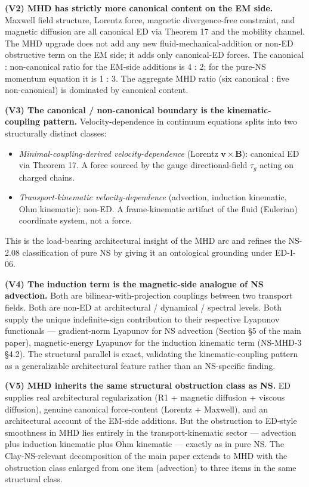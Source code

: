 \documentclass[
]{article}
\providecommand{\tightlist}{%
  \setlength{\itemsep}{0pt}\setlength{\parskip}{0pt}}
\begin{document}
\textbf{(V2) MHD has strictly more canonical content on the EM side.}
Maxwell field structure, Lorentz force, magnetic divergence-free
constraint, and magnetic diffusion are all canonical ED via Theorem 17
and the mobility channel. The MHD upgrade does not add any new
fluid-mechanical-addition or non-ED obstructive term on the EM side; it
adds only canonical-ED forces. The canonical : non-canonical ratio for
the EM-side additions is 4 : 2; for the pure-NS momentum equation it is
1 : 3. The aggregate MHD ratio (six canonical : five non-canonical) is
dominated by canonical content.

\textbf{(V3) The canonical / non-canonical boundary is the
kinematic-coupling pattern.} Velocity-dependence in continuum equations
splits into two structurally distinct classes:

\begin{itemize}
\tightlist
\item
  \emph{Minimal-coupling-derived velocity-dependence} (Lorentz
  \(\mathbf{v}\times\mathbf{B}\)): canonical ED via Theorem 17. A force
  sourced by the gauge directional-field \(\tau_g\) acting on charged
  chains.
\item
  \emph{Transport-kinematic velocity-dependence} (advection, induction
  kinematic, Ohm kinematic): non-ED. A frame-kinematic artifact of the
  fluid (Eulerian) coordinate system, not a force.
\end{itemize}

This is the load-bearing architectural insight of the MHD arc and
refines the NS-2.08 classification of pure NS by giving it an
ontological grounding under ED-I-06.

\textbf{(V4) The induction term is the magnetic-side analogue of NS
advection.} Both are bilinear-with-projection couplings between two
transport fields. Both are non-ED at architectural / dynamical /
spectral levels. Both supply the unique indefinite-sign contribution to
their respective Lyapunov functionals --- gradient-norm Lyapunov for NS
advection (Section §5 of the main paper), magnetic-energy Lyapunov for
the induction kinematic term (NS-MHD-3 §4.2). The structural parallel is
exact, validating the kinematic-coupling pattern as a generalizable
architectural feature rather than an NS-specific finding.

\textbf{(V5) MHD inherits the same structural obstruction class as NS.}
ED supplies real architectural regularization (R1 + magnetic diffusion +
viscous diffusion), genuine canonical force-content (Lorentz + Maxwell),
and an architectural account of the EM-side additions. But the
obstruction to ED-style smoothness in MHD lies entirely in the
transport-kinematic sector --- advection plus induction kinematic plus
Ohm kinematic --- exactly as in pure NS. The Clay-NS-relevant
decomposition of the main paper extends to MHD with the obstruction
class enlarged from one item (advection) to three items in the same
structural class.
\end{document}
